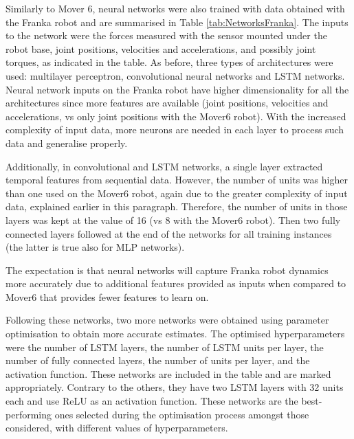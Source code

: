 Similarly to Mover 6, neural networks were also trained with data obtained with the Franka robot and are summarised in Table \ref{tab:NetworksFranka}. The inputs to the network were the forces measured with the sensor mounted under the robot base, joint positions, velocities and accelerations, and possibly joint torques, as indicated in the table. As before, three types of architectures were used: multilayer perceptron, convolutional neural networks and LSTM networks. Neural network inputs on the Franka robot have higher dimensionality for all the architectures since more features are available (joint positions, velocities and accelerations, vs only joint positions with the Mover6 robot). With the increased complexity of input data, more neurons are needed in each layer to process such data and generalise properly.

Additionally, in convolutional and LSTM networks, a single layer extracted temporal features from sequential data. However, the number of units was higher than one used on the Mover6 robot, again due to the greater complexity of input data, explained earlier in this paragraph. Therefore, the number of units in those layers was kept at the value of 16 (vs 8 with the Mover6 robot). Then two fully connected layers followed at the end of the networks for all training instances (the latter is true also for MLP networks).

The expectation is that neural networks will capture Franka robot dynamics more accurately due to additional features provided as inputs when compared to Mover6 that provides fewer features to learn on.

Following these networks, two more networks were obtained using parameter optimisation to obtain more accurate estimates. The optimised hyperparameters were the number of LSTM layers, the number of LSTM units per layer, the number of fully connected layers, the number of units per layer, and the activation function. These networks are included in the table and are marked appropriately. Contrary to the others, they have two LSTM layers with 32 units each and use ReLU as an activation function. These networks are the best-performing ones selected during the optimisation process amongst those considered, with different values of hyperparameters.

